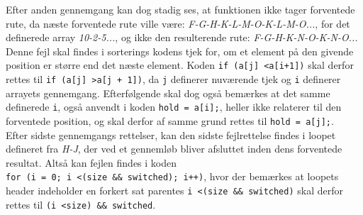 \documentclass[11pt]{article}
\newcommand{\code}[1]{\colorbox{codegray}{\texttt{#1}}}
\begin{document}
    Efter anden gennemgang kan dog stadig ses, at funktionen ikke tager forventede rute, da næste forventede rute ville være: \textit{F-G-H-K-L-M-O-K-L-M-O...}, for det definerede array \textit{10-2-5...}, og ikke den resulterende rute: \textit{F-G-H-K-N-O-K-N-O...}\\
    Denne fejl skal findes i sorterings kodens tjek for, om et element på den givende position er større end det næste element. Koden \code{if (a[j] \textless a[i+1])} skal derfor rettes til \code{if (a[j] \textgreater a[j + 1])}, da \code{j} definerer nuværende tjek og \code{i} definerer arrayets gennemgang. Efterfølgende skal dog også bemærkes at det samme definerede \code{i}, også anvendt i koden \code{hold = a[i];}, heller ikke relaterer til den forventede position, og skal derfor af samme grund rettes til \code{hold = a[j];}.\\
    Efter sidste gennemgangs rettelser, kan den sidste fejlrettelse findes i loopet defineret fra \textit{H-J}, der ved et gennemløb bliver afsluttet inden dens forventede resultat. Altså kan fejlen findes i koden \\
    \code{for (i = 0; i \textless (size \&\& switched); i++)}, hvor der bemærkes at loopets header indeholder en forkert sat parentes \code{i \textless (size \&\& switched)} skal derfor rettes til \code{(i \textless size) \&\& switched}.
\end{document}

